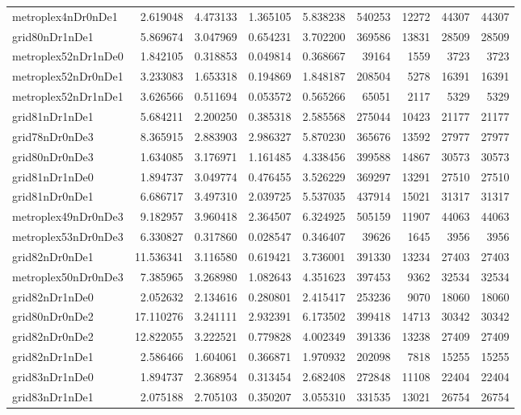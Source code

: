 \documentclass[../../../thesis.tex]{subfiles}
\begin{document}
\begin{longtable}{|l|r|r|r|r|r|r|r|r|}
metroplex4nDr0nDe1 & 2.619048 & 4.473133 & 1.365105 & 5.838238 & 540253 & 12272 & 44307 & 44307 \\
grid80nDr1nDe1 & 5.869674 & 3.047969 & 0.654231 & 3.702200 & 369586 & 13831 & 28509 & 28509 \\
metroplex52nDr1nDe0 & 1.842105 & 0.318853 & 0.049814 & 0.368667 & 39164 & 1559 & 3723 & 3723 \\
metroplex52nDr0nDe1 & 3.233083 & 1.653318 & 0.194869 & 1.848187 & 208504 & 5278 & 16391 & 16391 \\
metroplex52nDr1nDe1 & 3.626566 & 0.511694 & 0.053572 & 0.565266 & 65051 & 2117 & 5329 & 5329 \\
grid81nDr1nDe1 & 5.684211 & 2.200250 & 0.385318 & 2.585568 & 275044 & 10423 & 21177 & 21177 \\
grid78nDr0nDe3 & 8.365915 & 2.883903 & 2.986327 & 5.870230 & 365676 & 13592 & 27977 & 27977 \\
grid80nDr0nDe3 & 1.634085 & 3.176971 & 1.161485 & 4.338456 & 399588 & 14867 & 30573 & 30573 \\
grid81nDr1nDe0 & 1.894737 & 3.049774 & 0.476455 & 3.526229 & 369297 & 13291 & 27510 & 27510 \\
grid81nDr0nDe1 & 6.686717 & 3.497310 & 2.039725 & 5.537035 & 437914 & 15021 & 31317 & 31317 \\
metroplex49nDr0nDe3 & 9.182957 & 3.960418 & 2.364507 & 6.324925 & 505159 & 11907 & 44063 & 44063 \\
metroplex53nDr0nDe3 & 6.330827 & 0.317860 & 0.028547 & 0.346407 & 39626 & 1645 & 3956 & 3956 \\
grid82nDr0nDe1 & 11.536341 & 3.116580 & 0.619421 & 3.736001 & 391330 & 13234 & 27403 & 27403 \\
metroplex50nDr0nDe3 & 7.385965 & 3.268980 & 1.082643 & 4.351623 & 397453 & 9362 & 32534 & 32534 \\
grid82nDr1nDe0 & 2.052632 & 2.134616 & 0.280801 & 2.415417 & 253236 & 9070 & 18060 & 18060 \\
grid80nDr0nDe2 & 17.110276 & 3.241111 & 2.932391 & 6.173502 & 399418 & 14713 & 30342 & 30342 \\
grid82nDr0nDe2 & 12.822055 & 3.222521 & 0.779828 & 4.002349 & 391336 & 13238 & 27409 & 27409 \\
grid82nDr1nDe1 & 2.586466 & 1.604061 & 0.366871 & 1.970932 & 202098 & 7818 & 15255 & 15255 \\
grid83nDr1nDe0 & 1.894737 & 2.368954 & 0.313454 & 2.682408 & 272848 & 11108 & 22404 & 22404 \\
grid83nDr1nDe1 & 2.075188 & 2.705103 & 0.350207 & 3.055310 & 331535 & 13021 & 26754 & 26754 \\

\end{longtable}
\end{document}
